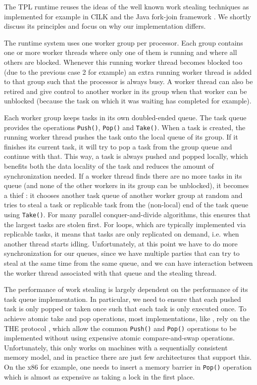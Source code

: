 
The TPL runtime reuses the ideas of the well known work stealing
techniques as implemented for example in CILK \cite{Frigo1998,
  Danaher2005} and the Java fork-join framework \cite{Lea2000,
  Lea2000a, Lea2004, Lea2006}. We shortly discuss its principles and
focus on why our implementation differs.

The runtime system uses one worker group per processor. Each group
contains one or more worker threads where only one of them is running
and where all others are blocked. Whenever this running worker thread
becomes blocked too (due to the previous case 2 for example) an extra
running worker thread is added to that group such that the processor
is always busy. A worker thread can also be retired and give control
to another worker in its group when that worker can be unblocked
(because the task on which it was waiting has completed for example).

Each worker group keeps tasks in its own doubled-ended queue. The task
queue provides the operations \lstinline!Push()!, \lstinline!Pop()! and
\lstinline!Take()!. When a task is created, the running worker thread
pushes the task onto the local queue of its group. If it finishes its
current task, it will try to pop a task from the group queue and
continue with that. This way, a task is always pushed and popped
locally, which benefits both the data locality of the task and reduces
the amount of synchronization needed. If a worker thread finds there
are no more tasks in its queue (and none of the other workers in its
group can be unblocked), it becomes a thief : it chooses another task
queue of another worker group at random and tries to steal a task or
replicable task from the (non-local) end of the task queue using
\lstinline!Take()!. For many parallel conquer-and-divide algorithms,
this ensures that the largest tasks are stolen first. For loops,
which are typically implemented via replicable tasks, it means that
tasks are only replicated on demand, i.e. when another thread starts
idling. Unfortunately, at this point we have to do more
synchronization for our queues, since we have multiple parties that
can try to steal at the same time from the same queue, and we can have
interaction between the worker thread associated with that queue and
the stealing thread.

The performance of work stealing is largely dependent on the
performance of its task queue implementation. In particular, we need
to ensure that each pushed task is only popped or taken once such that
each task is only executed once. To achieve atomic take and pop
operations, most implementations, like \cite{Arora2001}, rely on the
THE protocol \cite{Dijkstra1965}, which allow the common
\lstinline!Push()! and \lstinline!Pop()! operations to be implemented
without using expensive atomic compare-and-swap
operations. Unfortunately, this only works on machines with a
sequentially consistent memory model, and in practice there are just
few architectures that support this. On the x86 for example, one needs
to insert a memory barrier in \lstinline!Pop()! operation which is
almost as expensive as taking a lock in the first place.

